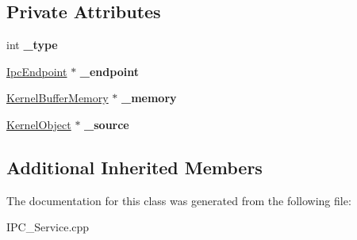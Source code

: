 \subsection*{Private Attributes}
\begin{DoxyCompactItemize}
\item 
\mbox{\label{class_i_p_c___service_1_1_userspace_provider_1_1_data_aa3501006f181884717697d1658ec89b3}} 
int {\bfseries \+\_\+type}
\item 
\mbox{\label{class_i_p_c___service_1_1_userspace_provider_1_1_data_a8972258a8d6d54fcd55cb3544496eaf8}} 
\hyperlink{class_ipc_endpoint}{Ipc\+Endpoint} $\ast$ {\bfseries \+\_\+endpoint}
\item 
\mbox{\label{class_i_p_c___service_1_1_userspace_provider_1_1_data_a8ba7300c495011bfc0930c2a58168d76}} 
\hyperlink{class_kernel_buffer_memory}{Kernel\+Buffer\+Memory} $\ast$ {\bfseries \+\_\+memory}
\item 
\mbox{\label{class_i_p_c___service_1_1_userspace_provider_1_1_data_af56838f51c3f581ebd3175ce919dde28}} 
\hyperlink{class_kernel_object}{Kernel\+Object} $\ast$ {\bfseries \+\_\+source}
\end{DoxyCompactItemize}
\subsection*{Additional Inherited Members}


The documentation for this class was generated from the following file\+:\begin{DoxyCompactItemize}
\item 
I\+P\+C\+\_\+\+Service.\+cpp\end{DoxyCompactItemize}
